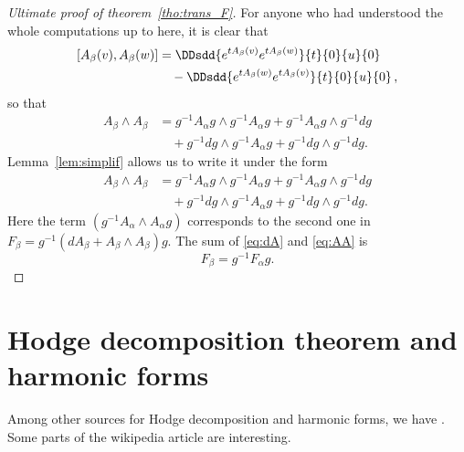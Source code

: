 \begin{proof}[Ultimate proof of theorem~\ref{tho:trans_F}]
	For anyone who had understood the whole computations up to here, it is clear that
	\begin{equation}
		\begin{split}
			[A_{\beta}(v),A_{\beta}(w)]&=\DDsdd{ e^{tA_{\beta}(v)}e^{tA_{\beta}(w)} }{t}{0}{u}{0}\\
			&\quad-\DDsdd{ e^{tA_{\beta}(w)}e^{tA_{\beta}(v)} }{t}{0}{u}{0}\,,
		\end{split}
	\end{equation}
	so that
	\begin{equation}
		\begin{split}
			A_{\beta}\wedge A_{\beta}&=g^{-1} A_{\alpha} g\wedge g^{-1} A_{\alpha} g
			+g^{-1} A_{\alpha} g\wedge g^{-1} dg\\
			&\quad+g^{-1} dg\wedge g^{-1} A_{\alpha} g
			+g^{-1} dg\wedge g^{-1} dg.
		\end{split}
	\end{equation}
	Lemma~\ref{lem:simplif} allows us to write it under the form
	\begin{equation}\label{eq:AA}
		\begin{split}
			A_{\beta}\wedge A_{\beta}&=g^{-1} A_{\alpha} g\wedge g^{-1} A_{\alpha} g
			+g^{-1} A_{\alpha} g\wedge g^{-1} dg\\
			&\quad+g^{-1} dg\wedge g^{-1} A_{\alpha} g
			+g^{-1} dg\wedge g^{-1} dg.
		\end{split}
	\end{equation}
	Here the term $(g^{-1} A_{\alpha}\wedge A_{\alpha} g)$ corresponds to the second one in $F_{\beta}=g^{-1}(dA_{\beta}+A_{\beta}\wedge A_{\beta})g$. The sum of \eqref{eq:dA} and \eqref{eq:AA} is
	\[
		F_{\beta}=g^{-1} F_{\alpha} g.
	\]
\end{proof}

\section{Hodge decomposition theorem and harmonic forms}

Among other sources for Hodge decomposition and harmonic forms, we have \cite{JohnsonHodge,CohoHarBound,UndergradDeRham}. Some parts of the wikipedia article  are interesting.

